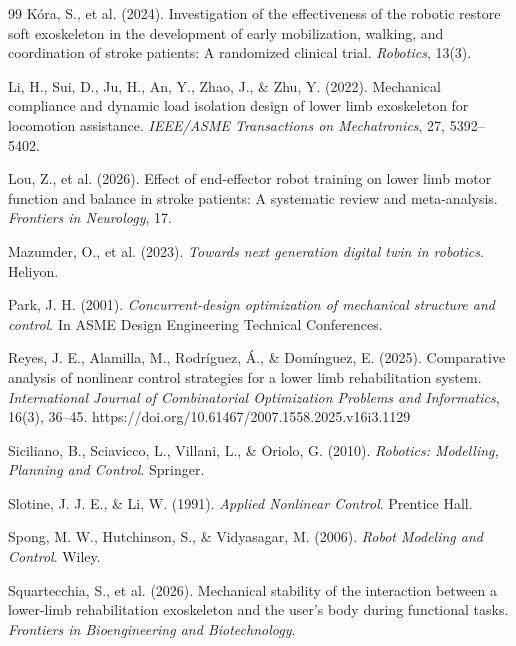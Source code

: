 \documentclass[a4paper,12pt]{article}
\begin{document}
\begin{thebibliography}{99}
    K{\'o}ra, S., et al. (2024).
    \newblock Investigation of the effectiveness of the robotic restore soft exoskeleton in the development of early mobilization, walking, and coordination of stroke patients: A randomized clinical trial.
    \newblock \emph{Robotics}, 13(3).

    Li, H., Sui, D., Ju, H., An, Y., Zhao, J., \& Zhu, Y. (2022).
    \newblock Mechanical compliance and dynamic load isolation design of lower limb exoskeleton for locomotion assistance.
    \newblock \emph{IEEE/ASME Transactions on Mechatronics}, 27, 5392--5402.

    Lou, Z., et al. (2026).
    \newblock Effect of end-effector robot training on lower limb motor function and balance in stroke patients: A systematic review and meta-analysis.
    \newblock \emph{Frontiers in Neurology}, 17.

    Mazumder, O., et al. (2023). \textit{Towards next generation digital twin in robotics}. Heliyon.

    Park, J. H. (2001). \textit{Concurrent-design optimization of mechanical structure and control}. In ASME Design Engineering Technical Conferences.

    Reyes, J. E., Alamilla, M., Rodríguez, Á., \& Domínguez, E. (2025). Comparative analysis of nonlinear control strategies for a lower limb rehabilitation system. \textit{International Journal of Combinatorial Optimization Problems and Informatics}, 16(3), 36--45. https://doi.org/10.61467/2007.1558.2025.v16i3.1129

    Siciliano, B., Sciavicco, L., Villani, L., \& Oriolo, G. (2010). \textit{Robotics: Modelling, Planning and Control}. Springer.

    Slotine, J. J. E., \& Li, W. (1991). \textit{Applied Nonlinear Control}. Prentice Hall.

    Spong, M. W., Hutchinson, S., \& Vidyasagar, M. (2006). \textit{Robot Modeling and Control}. Wiley.

    Squartecchia, S., et al. (2026).
    \newblock Mechanical stability of the interaction between a lower-limb rehabilitation exoskeleton and the user's body during functional tasks.
    \newblock \emph{Frontiers in Bioengineering and Biotechnology}.


\end{thebibliography}
\end{document}
